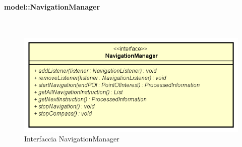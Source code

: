 \documentclass[../DefinizioneDiProdotto.tex]{subfiles}
\begin{document}
\paragraph{model::NavigationManager}
\
\begin{figure}[H]
	\centering
	\includegraphics[width=\maxwidth]{img/NavigationManager.png}
	\caption{Interfaccia NavigationManager}\label{fig:model::NavigationManager} 
\end{figure}
\end{document}
